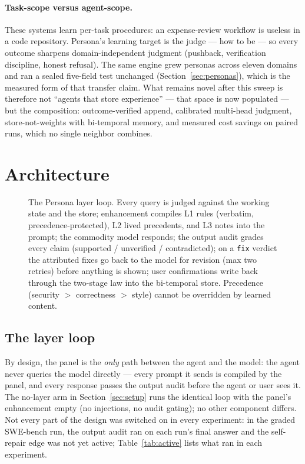 \documentclass[11pt]{article}
\begin{document}
\paragraph{Task-scope versus agent-scope.} These systems learn per-task procedures: an expense-review workflow is useless in a code repository. Persona's learning target is the judge --- how to be --- so every outcome sharpens domain-independent judgment (pushback, verification discipline, honest refusal). The same engine grew personas across eleven domains and ran a sealed five-field test unchanged (Section~\ref{sec:personas}), which is the measured form of that transfer claim. What remains novel after this sweep is therefore not ``agents that store experience'' --- that space is now populated --- but the composition: outcome-verified append, calibrated multi-head judgment, store-not-weights with bi-temporal memory, and measured cost savings on paired runs, which no single neighbor combines.

\section{Architecture}
\label{sec:arch}

\begin{figure}[htbp]
  \centering
  \resizebox{\textwidth}{!}{}
  \caption{The Persona layer loop. Every query is judged against the working state and the store; enhancement compiles L1 rules (verbatim, precedence-protected), L2 lived precedents, and L3 notes into the prompt; the commodity model responds; the output audit grades every claim (supported / unverified / contradicted); on a \texttt{fix} verdict the attributed fixes go back to the model for revision (max two retries) before anything is shown; user confirmations write back through the two-stage law into the bi-temporal store. Precedence (security $>$ correctness $>$ style) cannot be overridden by learned content.}
  \label{fig:arch}
\end{figure}

\subsection{The layer loop}

By design, the panel is the \emph{only} path between the agent and the model: the agent never queries the model directly --- every prompt it sends is compiled by the panel, and every response passes the output audit before the agent or user sees it. The no-layer arm in Section~\ref{sec:setup} runs the identical loop with the panel's enhancement empty (no injections, no audit gating); no other component differs. Not every part of the design was switched on in every experiment: in the graded SWE-bench run, the output audit ran on each run's final answer and the self-repair edge was not yet active; Table~\ref{tab:active} lists what ran in each experiment.
\end{document}
